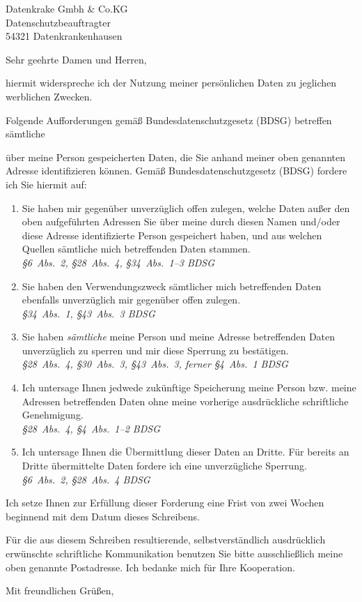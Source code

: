\documentclass[DIN, 
	parskip=half, 
	fromalign=left, 
	fromphone=false, 
	fromfax=false,
	fromemail=true, 
	fromurl=false, 
	fromlogo=false, 
	fromrule=true, 
	foldmarks=false, 
]{scrlttr2}
\begin{document}
\begin{letter}{
Datenkrake Gmbh  \& Co.KG\\
Datenschutzbeauftragter\\
54321 Datenkrankenhausen\\
}

\opening{Sehr geehrte Damen und Herren,}

hiermit widerspreche ich der Nutzung meiner persönlichen Daten zu jeglichen werblichen Zwecken.

Folgende Aufforderungen gemäß Bundesdatenschutzgesetz (BDSG) betreffen sämtliche

über meine Person gespeicherten Daten, die Sie anhand meiner oben genannten Adresse identifizieren können. Gemäß Bundesdatenschutzgesetz (BDSG) fordere ich Sie hiermit auf:

\begin{enumerate}
	\item{Sie haben mir gegenüber unverzüglich offen zulegen, welche Daten außer
	den oben aufgeführten Adressen Sie über meine durch diesen Namen und/oder diese Adresse identifizierte Person gespeichert haben, und aus welchen Quellen sämtliche mich betreffenden Daten stammen.\\
	\emph{\S6~Abs.~2, \S28~Abs.~4, \S34~Abs.~1--3 BDSG}}
	\item{Sie haben den Verwendungszweck sämtlicher mich betreffenden Daten ebenfalls unverzüglich mir gegenüber offen zulegen.\\	
	\emph{\S34~Abs.~1, \S43~Abs.~3 BDSG}}
	\item{Sie haben \emph{sämtliche} meine Person und meine Adresse betreffenden Daten unverzüglich zu sperren und mir diese Sperrung zu bestätigen.\\ 
	\emph{\S28~Abs.~4, \S30~Abs.~3, \S43~Abs.~3, ferner \S4~Abs.~1 BDSG}}
	\item{Ich untersage Ihnen jedwede zukünftige Speicherung meine Person bzw. meine Adressen betreffenden Daten ohne meine vorherige ausdrückliche schriftliche Genehmigung.\\	
	\emph{\S28~Abs.~4, \S4~Abs.~1--2 BDSG}}
	\item{Ich untersage Ihnen die Übermittlung dieser Daten an Dritte. Für bereits an Dritte übermittelte Daten fordere ich eine unverzügliche Sperrung.\\ 
	\emph{\S6~Abs.~2, \S28~Abs.~4 BDSG}}
\end{enumerate}

Ich setze Ihnen zur Erfüllung dieser Forderung eine Frist von zwei Wochen beginnend mit dem Datum dieses Schreibens.

Für die aus diesem Schreiben resultierende, selbstverständlich ausdrücklich
erwünschte schriftliche Kommunikation benutzen Sie bitte ausschließlich meine
oben genannte Postadresse. Ich bedanke mich für Ihre Kooperation.

\closing{Mit freundlichen Grüßen,}

\end{letter}
\end{document}
